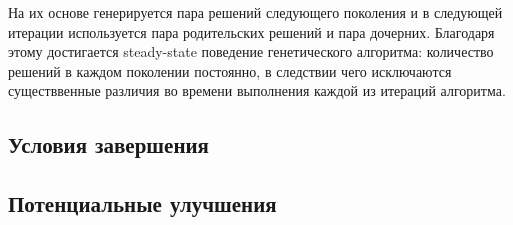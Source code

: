 На их основе генерируется пара решений следующего поколения и в следующей итерации используется пара родительских решений и пара дочерних. Благодаря этому достигается steady-state поведение генетического алгоритма: количество решений в каждом поколении постоянно, в следствии чего исключаются существвенные различия во времени выполнения каждой из итераций алгоритма.



\subsection*{Условия завершения}

\subsection*{Потенциальные улучшения}


